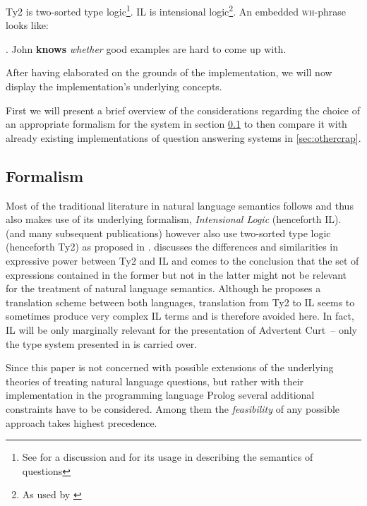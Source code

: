 \documentclass[12pt,a4paper]{article}
\newcommand{\abbr}{\textsf} %
\newcommand{\stress}{\textbf} %
\newcommand{\pn}{\textsf} %
\newcommand{\wh}{\textsc{wh}} %
\newcommand{\acurt}{\pn{Advertent Curt}\mbox{ }}
\theoremstyle{remark} \newtheorem*{termin}{Definition} %
\begin{document}
\abbr{Ty2} is two-sorted type logic\footnote{See \cite{gallin:ty2} for a
discussion and \cite{gs:sqpa} for its usage in describing the semantics of
questions}. \abbr{IL} is intensional logic\footnote{As used by \cite{ptq}}. 
An embedded \wh-phrase looks
like:%

\ex. John \stress{knows} \emph{whether} good examples are hard to come up with.

After having elaborated on the grounds of the implementation, we will now
display the implementation's underlying concepts. %


First we will present a brief overview of the considerations regarding the
choice of an appropriate formalism for the system in section \ref{sec:formal}
to then compare it with already existing implementations of question answering
systems in \ref{sec:othercrap}.

\subsection{Formalism}\label{sec:formal}


Most of the traditional literature in natural language semantics follows
\cite{ptq} and thus also makes use of its underlying formalism,
\emph{Intensional Logic} (henceforth \abbr{IL}). \cite{gs:sqpa} (and many subsequent
publications) however also use two-sorted type logic (henceforth \abbr{Ty2}) as
proposed in \cite{gallin:ty2}. \cite{z:ilty2} discusses the differences and
similarities in expressive power between \abbr{Ty2} and \abbr{IL} and comes to
the conclusion that the set of expressions contained in the former but not in
the latter might not be relevant for the treatment of natural language
semantics. Although he proposes a translation scheme between both languages,
translation from \abbr{Ty2} to \abbr{IL} seems to sometimes produce very complex
\abbr{IL} terms and is therefore avoided here. In fact, \abbr{IL} will be only
marginally relevant for the presentation of \acurt – only the type system
presented in \cite{ptq} is carried over.


Since this paper is not concerned with possible extensions of the underlying
theories of treating natural language questions, but rather with their
implementation in the programming language \pn{Prolog} several additional
constraints have to be considered. Among them the \emph{feasibility} of any
possible approach takes highest precedence.
\end{document}
